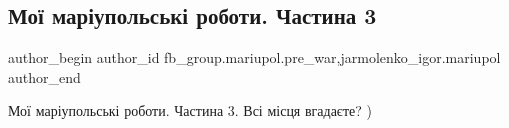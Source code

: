  
 
 
 
 

\subsection{Мої маріупольські роботи. Частина 3}
\label{sec:20_01_2023.fb.fb_group.mariupol.pre_war.1.mo__mar_upolsk__robo}
 
\ifcmt
 author_begin
   author_id fb_group.mariupol.pre_war,jarmolenko_igor.mariupol
 author_end
\fi

Мої маріупольські роботи. Частина 3. Всі місця вгадаєте? )
